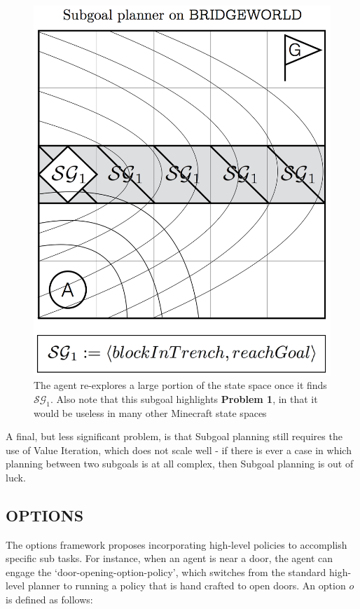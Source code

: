 \documentclass[]{article}
\begin{document}
\begin{figure}
\centering
\includegraphics[scale=0.22]{figures/bridgeworld_sg.png}
\caption{The agent re-explores a large portion of the state space once it finds $\mathcal{SG}_1$. Also note that this subgoal highlights {\bf Problem 1}, in that it would be useless in many other Minecraft state spaces}
\end{figure}


A final, but less significant problem, is that Subgoal planning still requires the use of Value Iteration, which does not scale well - if there is ever a case in which planning between two subgoals is at all complex, then Subgoal planning is out of luck.

\subsection{OPTIONS}

The options framework proposes incorporating high-level policies to accomplish specific sub tasks. For instance, when an agent is near a door, the agent can engage the `door-opening-option-policy', which switches from the standard high-level planner to running a policy that is hand crafted to open doors. An option $o$ is defined as follows:
\end{document}
